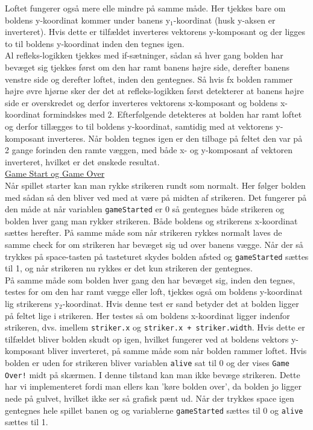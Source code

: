 Loftet fungerer også mere elle mindre på samme måde. Her tjekkes bare om boldens y-koordinat kommer under banens y$_{1}$-koordinat (husk y-aksen er inverteret). Hvis dette er tilfældet inverteres vektorens y-komposant og der ligges to til boldens y-koordinat inden den tegnes igen. \\

Al refleks-logikken tjekkes med if-sætninger, sådan så hver gang bolden har bevæget sig tjekkes først om den har ramt banens højre side, derefter banens venstre side og derefter loftet, inden den gentegnes. Så hvis fx bolden rammer højre øvre hjørne sker der det at refleks-logikken først detekterer at banens højre side er overskredet og derfor inverteres vektorens x-komposant og boldens x-koordinat formindskes med 2. Efterfølgende detekteres at bolden har ramt loftet og derfor tillægges to til boldens y-koordinat, samtidig med at vektorens y-komposant inverteres. Når bolden tegnes igen er den tilbage på feltet den var på 2 gange forinden den ramte væggen, med både x- og y-komposant af vektoren inverteret, hvilket er det ønskede resultat.\\

\underline{Game Start og Game Over}\\

Når spillet starter kan man rykke strikeren rundt som normalt. Her følger bolden med sådan så den bliver ved med at være på midten af strikeren. Det fungerer på den måde at når variablen \texttt{gameStarted} er 0 så gentegnes både strikeren og bolden hver gang man rykker strikeren. Både boldens og strikerens x-koordinat sættes herefter. På samme måde som når strikeren rykkes normalt laves de samme check for om strikeren har bevæget sig ud over banens vægge. Når der så trykkes på space-tasten på tasteturet skydes bolden afsted og \texttt{gameStarted} sættes til 1, og når strikeren nu rykkes er det kun strikeren der gentegnes.\\

På samme måde som bolden hver gang den har bevæget sig, inden den tegnes, testes for om den har ramt vægge eller loft, tjekkes også om boldens y-koordinat lig strikerens y$_{2}$-koordinat. Hvis denne test er sand betyder det at bolden ligger på feltet lige i strikeren. Her testes så om boldens x-koordinat ligger indenfor strikeren, dvs. imellem \texttt{striker.x} og \texttt{striker.x + striker.width}. Hvis dette er tilfældet bliver bolden skudt op igen, hvilket fungerer ved at boldens vektors y-komposant bliver inverteret, på samme måde som når bolden rammer loftet. Hvis bolden er uden for strikeren bliver variablen \texttt{alive} sat til 0 og der vises \texttt{Game Over!} midt på skærmen. I denne tilstand kan man ikke bevæge strikeren. Dette har vi implementeret fordi man ellers kan 'køre bolden over', da bolden jo ligger nede på gulvet, hvilket ikke ser så grafisk pænt ud. Når der trykkes space igen gentegnes hele spillet banen og og variablerne \texttt{gameStarted} sættes til 0 og \texttt{alive} sættes til 1.

